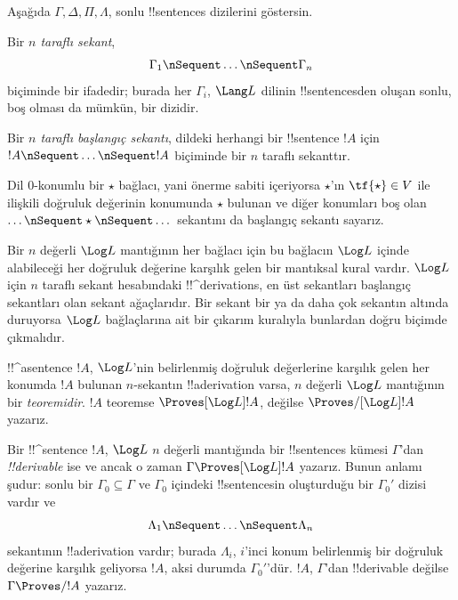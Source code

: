 



Aşağıda $\Gamma,\Delta,\Pi,\Lambda$, sonlu !!{sentence}s dizilerini
göstersin.

\begin{defn}[Sekant]
Bir \emph{$n$ taraflı sekant},
\[
\Gamma_1 \nSequent \dots \nSequent \Gamma_n
\]
biçiminde bir ifadedir; burada her $\Gamma_i$, $\Lang L$ dilinin
!!{sentence}s{}den oluşan sonlu, boş olması da mümkün, bir dizidir.
\end{defn}

\begin{defn}
Bir \emph{$n$ taraflı başlangıç sekantı}, dildeki herhangi bir !!{sentence}
$!A$ için $!A\nSequent\dots\nSequent !A$ biçiminde bir $n$ taraflı
sekanttır.

Dil $0$-konumlu bir $\star$ bağlacı, yani önerme sabiti içeriyorsa
$\star$'ın $\tf{\star}\in V$ ile ilişkili doğruluk değerinin konumunda
$\star$ bulunan ve diğer konumları boş olan
$\dots\nSequent\star\nSequent\dots$ sekantını da başlangıç sekantı sayarız.
\end{defn}

Bir $n$ değerli $\Log L$ mantığının her bağlacı için bu bağlacın $\Log L$
içinde alabileceği her doğruluk değerine karşılık gelen bir mantıksal kural
vardır. $\Log L$ için $n$ taraflı sekant hesabındaki !!^{derivation}s,
en üst sekantları başlangıç sekantları olan sekant ağaçlarıdır. Bir sekant
bir ya da daha çok sekantın altında duruyorsa $\Log L$ bağlaçlarına ait bir
çıkarım kuralıyla bunlardan doğru biçimde çıkmalıdır.

\begin{defn}[Teoremler]
!!^a{sentence} $!A$, $\Log L$'nin belirlenmiş doğruluk değerlerine karşılık
gelen her konumda $!A$ bulunan $n$-sekantın !!a{derivation} varsa, $n$
değerli $\Log L$ mantığının bir \emph{teoremidir}. $!A$ teoremse
$\Proves[\Log L]!A$, değilse $\Proves/[\Log L]!A$ yazarız.
\end{defn}

\begin{defn}[!!^{derivability}]
Bir !!^{sentence} $!A$, $\Log L$ $n$ değerli mantığında bir !!{sentence}s
kümesi $\Gamma$'dan \emph{!!{derivable}} ise ve ancak o zaman
$\Gamma\Proves[\Log L]!A$ yazarız. Bunun anlamı şudur: sonlu bir
$\Gamma_0\subseteq\Gamma$ ve $\Gamma_0$ içindeki !!{sentence}s{}in oluşturduğu
bir $\Gamma_0'$ dizisi vardır ve
\[ \Lambda_1 \nSequent \dots \nSequent \Lambda_n \]
sekantının !!a{derivation} vardır; burada $\Lambda_i$, $i$'inci konum
belirlenmiş bir doğruluk değerine karşılık geliyorsa $!A$, aksi durumda
$\Gamma_0'$'dür. $!A$, $\Gamma$'dan !!{derivable} değilse
$\Gamma\Proves/!A$ yazarız.
\end{defn}

